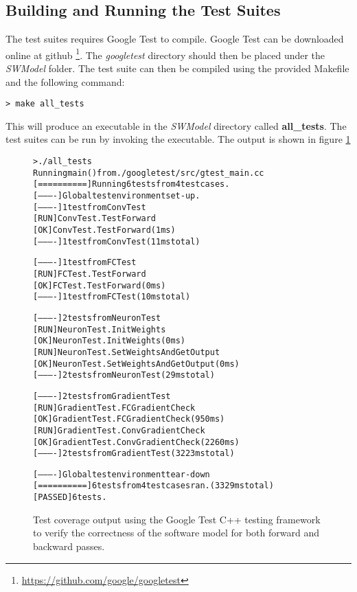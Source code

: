 \subsection{Building and Running the Test Suites}
The test suites requires Google Test to compile. Google Test can be downloaded online at github \footnote{\url{https://github.com/google/googletest}}. The \textit{googletest} directory should then be placed under the \textit{SWModel} folder. The test suite can then be compiled using the provided Makefile and the following command:
\begin{lstlisting}
> make all_tests
\end{lstlisting}
This will produce an executable in the \textit{SWModel} directory called \textbf{all\_tests}. The test suites can be run by invoking the executable. The output is shown in figure \ref{goog-out}
\begin{figure}

\begin{framed}
\begin{alltt}
> ./all\_tests
Running main() from ./googletest/src/gtest\_main.cc
{\color{mygreen}[==========]} Running 6 tests from 4 test cases.
{\color{mygreen}[----------]} Global test environment set-up.
{\color{mygreen}[----------]} 1 test from ConvTest
{\color{mygreen}[ RUN      ]} ConvTest.TestForward
{\color{mygreen}[       OK ]} ConvTest.TestForward (1 ms)
{\color{mygreen}[----------]} 1 test from ConvTest (11 ms total)

{\color{mygreen}[----------]} 1 test from FCTest
{\color{mygreen}[ RUN      ]} FCTest.TestForward
{\color{mygreen}[       OK ]} FCTest.TestForward (0 ms)
{\color{mygreen}[----------]} 1 test from FCTest (10 ms total)

{\color{mygreen}[----------]} 2 tests from NeuronTest
{\color{mygreen}[ RUN      ]} NeuronTest.InitWeights
{\color{mygreen}[       OK ]} NeuronTest.InitWeights (0 ms)
{\color{mygreen}[ RUN      ]} NeuronTest.SetWeightsAndGetOutput
{\color{mygreen}[       OK ]} NeuronTest.SetWeightsAndGetOutput (0 ms)
{\color{mygreen}[----------]} 2 tests from NeuronTest (29 ms total)

{\color{mygreen}[----------]} 2 tests from GradientTest
{\color{mygreen}[ RUN      ]} GradientTest.FCGradientCheck
{\color{mygreen}[       OK ]} GradientTest.FCGradientCheck (950 ms)
{\color{mygreen}[ RUN      ]} GradientTest.ConvGradientCheck
{\color{mygreen}[       OK ]} GradientTest.ConvGradientCheck (2260 ms)
{\color{mygreen}[----------]} 2 tests from GradientTest (3223 ms total)

{\color{mygreen}[----------]} Global test environment tear-down
{\color{mygreen}[==========]} 6 tests from 4 test cases ran. (3329 ms total)
{\color{mygreen}[  PASSED  ]} 6 tests.
\end{alltt}
\end{framed}
\caption{Test coverage output using the Google Test C++ testing framework to verify the correctness of the software model for both forward and backward passes.}
\label{goog-out}
\end{figure}

